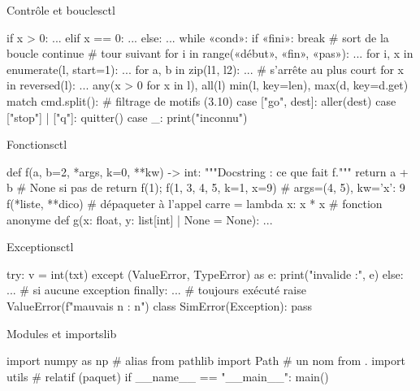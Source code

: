 \documentclass{article}
\begin{document}
\begin{colonne}
\begin{bloc}{Contrôle et boucles}{ctl}
\begin{code}
if x > 0:
    ...
elif x == 0:
    ...
else:
    ...
while «cond»:
    if «fini»: break  # sort de la boucle
    continue        # tour suivant
for i in range(«début», «fin», «pas»): ...
for i, x in enumerate(l, start=1): ...
for a, b in zip(l1, l2): ...  # s'arrête au plus court
for x in reversed(l): ...
any(x > 0 for x in l), all(l)
min(l, key=len), max(d, key=d.get)
match cmd.split():  # filtrage de motifs (3.10)
    case ["go", dest]: aller(dest)
    case ["stop"] | ["q"]: quitter()
    case _: print("inconnu")
\end{code}
\end{bloc}

\begin{bloc}{Fonctions}{ctl}
\begin{code}
def f(a, b=2, *args, k=0, **kw) -> int:
    """Docstring : ce que fait f."""
    return a + b               # None si pas de return
f(1); f(1, 3, 4, 5, k=1, x=9)  # args=(4, 5), kw={'x': 9}
f(*liste, **dico)              # dépaqueter à l'appel
carre = lambda x: x * x        # fonction anonyme
def g(x: float, y: list[int] | None = None): ...
\end{code}
\end{bloc}

\begin{bloc}{Exceptions}{ctl}
\begin{code}
try:
    v = int(txt)
except (ValueError, TypeError) as e:
    print("invalide :", e)
else:
    ...  # si aucune exception
finally:
    ...  # toujours exécuté
raise ValueError(f"mauvais n : {n}")
class SimError(Exception): pass
\end{code}
\end{bloc}

\begin{bloc}{Modules et imports}{lib}
\begin{code}
import numpy as np        # alias
from pathlib import Path  # un nom
from . import utils       # relatif (paquet)
if __name__ == "__main__": main()
\end{code}
\end{bloc}
\end{colonne}\colbreak
\end{document}
